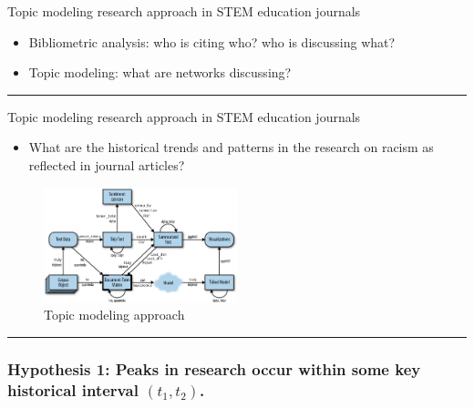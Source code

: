 \documentclass[
  letterpaper,
  DIV=11,
  numbers=noendperiod]{scrartcl}
\providecommand{\tightlist}{%
  \setlength{\itemsep}{0pt}\setlength{\parskip}{0pt}}\usepackage{longtable,booktabs,array}
\begin{document}
Topic modeling research approach in STEM education journals

\begin{itemize}
\item
  Bibliometric analysis: who is citing who? who is discussing what?
\item
  Topic modeling: what are networks discussing?
\end{itemize}

\begin{center}\rule{0.5\linewidth}{0.5pt}\end{center}

Topic modeling research approach in STEM education journals

\begin{itemize}
\tightlist
\item
  What are the historical trends and patterns in the research on racism
  as reflected in journal articles?
\end{itemize}

\begin{figure}

{\centering \includegraphics[width=0.5\textwidth,height=\textheight]{quanteda.png}

}

\caption{Topic modeling approach}

\end{figure}

\begin{center}\rule{0.5\linewidth}{0.5pt}\end{center}

\hypertarget{hypothesis-1-peaks-in-research-occur-within-some-key-historical-interval-t_1-t_2.}{%
\subsubsection{\texorpdfstring{Hypothesis 1: Peaks in research occur
within some key historical interval
\((t_1, t_2)\).}{Hypothesis 1: Peaks in research occur within some key historical interval (t\_1, t\_2).}}\label{hypothesis-1-peaks-in-research-occur-within-some-key-historical-interval-t_1-t_2.}}
\end{document}
